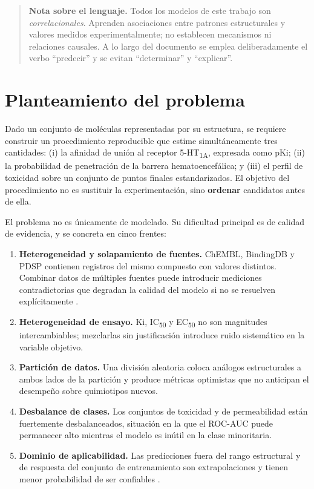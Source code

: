 \begin{quote}\small
\textbf{Nota sobre el lenguaje.} Todos los modelos de este trabajo son
\emph{correlacionales}. Aprenden asociaciones entre patrones estructurales y
valores medidos experimentalmente; no establecen mecanismos ni relaciones
causales. A lo largo del documento se emplea deliberadamente el verbo
\enquote{predecir} y se evitan \enquote{determinar} y \enquote{explicar}.
\end{quote}
 
\section{Planteamiento del problema}
\label{sec:intro-planteamiento}
 
Dado un conjunto de moléculas representadas por su estructura, se requiere
construir un procedimiento reproducible que estime simultáneamente tres
cantidades: (i) la afinidad de unión al receptor 5-HT\textsubscript{1A},
expresada como pKi; (ii) la probabilidad de penetración de la barrera
hematoencefálica; y (iii) el perfil de toxicidad sobre un conjunto de puntos
finales estandarizados. El objetivo del procedimiento no es sustituir la
experimentación, sino \textbf{ordenar} candidatos antes de ella.
 
El problema no es únicamente de modelado. Su dificultad principal es de calidad
de evidencia, y se concreta en cinco frentes:
 
\begin{enumerate}
  \item \textbf{Heterogeneidad y solapamiento de fuentes.} ChEMBL, BindingDB y
        PDSP contienen registros del mismo compuesto con valores distintos.
        Combinar datos de múltiples fuentes puede introducir mediciones
        contradictorias que degradan la calidad del modelo si no se resuelven
        explícitamente \cite{faramarzi_development_2022}.
  \item \textbf{Heterogeneidad de ensayo.} Ki, IC\textsubscript{50} y
        EC\textsubscript{50} no son magnitudes intercambiables; mezclarlas sin
        justificación introduce ruido sistemático en la variable objetivo.
  \item \textbf{Partición de datos.} Una división aleatoria coloca análogos
        estructurales a ambos lados de la partición y produce métricas
        optimistas que no anticipan el desempeño sobre quimiotipos nuevos.
  \item \textbf{Desbalance de clases.} Los conjuntos de toxicidad y de
        permeabilidad están fuertemente desbalanceados, situación en la que el
        ROC-AUC puede permanecer alto mientras el modelo es inútil en la clase
        minoritaria.
  \item \textbf{Dominio de aplicabilidad.} Las predicciones fuera del rango
        estructural y de respuesta del conjunto de entrenamiento son
        extrapolaciones y tienen menor probabilidad de ser confiables
        \cite{czub_automlbased_2022}.
\end{enumerate}
 
